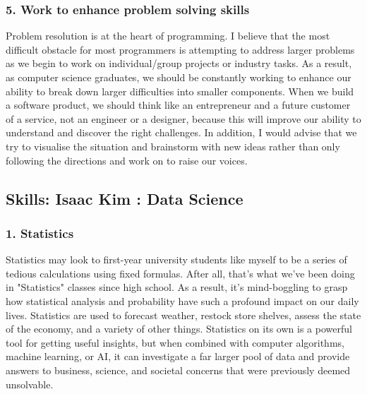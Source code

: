 \documentclass[a4paper, 11pt]{report}
\begin{document}
    \subsubsection{5. Work to enhance problem solving skills}
    Problem resolution is at the heart of programming. I believe that the most difficult obstacle for most programmers is attempting to address larger problems as we begin to work on individual/group projects or industry tasks. As a result, as computer science graduates, we should be constantly working to enhance our ability to break down larger difficulties into smaller components. When we build a software product, we should think like an entrepreneur and a future customer of a service, not an engineer or a designer, because this will improve our ability to understand and discover the right challenges. In addition, I would advise that we try to visualise the situation and brainstorm with new ideas rather than only following the directions and work on to raise our voices.


\subsection{Skills: Isaac Kim : Data Science}
    \subsubsection{1. Statistics}
    Statistics may look to first-year university students like myself to be a series of tedious calculations using fixed formulas. After all, that's what we've been doing in "Statistics" classes since high school. As a result, it's mind-boggling to grasp how statistical analysis and probability have such a profound impact on our daily lives. Statistics are used to forecast weather, restock store shelves, assess the state of the economy, and a variety of other things.\cite{isaac1} Statistics on its own is a powerful tool for getting useful insights, but when combined with computer algorithms, machine learning, or AI, it can investigate a far larger pool of data and provide answers to business, science, and societal concerns that were previously deemed unsolvable.\cite{isaac2}
\end{document}
